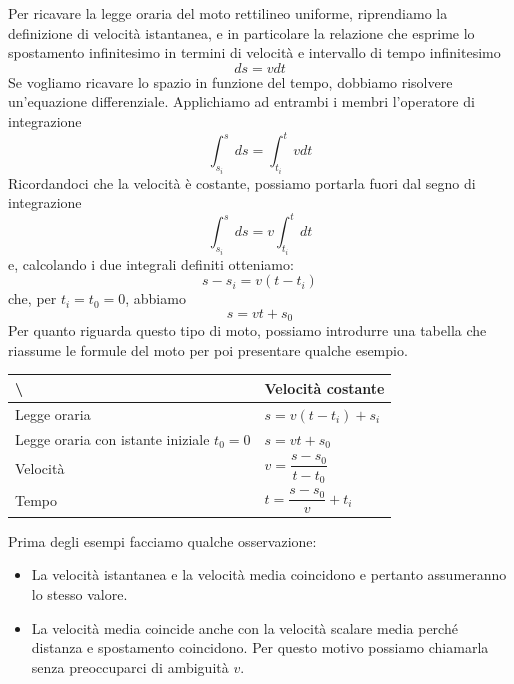 \documentclass[11pt]{article}
\begin{document}
Per ricavare la legge oraria del moto rettilineo uniforme, riprendiamo la definizione di velocità istantanea, e in particolare la relazione che esprime lo spostamento infinitesimo in termini di velocità e intervallo di tempo infinitesimo \begin{equation*}
ds = vdt
\end{equation*}
Se vogliamo ricavare lo spazio in funzione del tempo, dobbiamo risolvere un'equazione differenziale. Applichiamo ad entrambi i membri l'operatore di integrazione
\begin{equation*}
\int_{s_i}^{s} ds = \int_{t_i}^{t} vdt
\end{equation*}
Ricordandoci che la velocità è costante, possiamo portarla fuori dal segno di integrazione
\begin{equation}
\int_{s_i}^{s} ds = v\int_{t_i}^{t} dt
\end{equation}
e, calcolando i due integrali definiti otteniamo:
\begin{equation*}
s - s_i= v(t-t_i)
\end{equation*}
che, per $t_i = t_0 = 0$, abbiamo
\begin{equation}
s=vt +s_0
\end{equation}
Per quanto riguarda questo tipo di moto, possiamo introdurre una tabella che riassume le formule del moto per poi presentare qualche esempio.

\begin{table}[H]
\begin{tabular}{l|l}

\textbackslash{}                            & Velocità costante           \\ \hline
Legge oraria                                & $s=v(t-t_i) + s_i$          \\ \hline
Legge oraria con istante iniziale $t_0 = 0$ & $s= vt +s_0$                \\ \hline
Velocità                                    & $v=\dfrac{s-s_0}{t-t_0}$     \\ \hline
Tempo                                       & $ t= \dfrac{s-s_0}{v} + t_i$ \\ 
\end{tabular}
\end{table}
Prima degli esempi facciamo qualche osservazione:
\begin{itemize}
	\item La velocità istantanea e la velocità media coincidono e pertanto assumeranno lo stesso valore.
	\item La velocità media coincide anche con la velocità scalare media perché distanza e spostamento coincidono. Per questo motivo possiamo chiamarla senza preoccuparci di ambiguità $v$.
\end{itemize}
\end{document}
